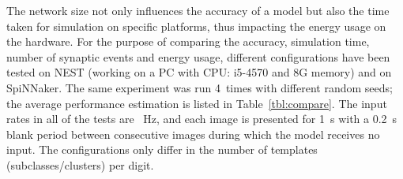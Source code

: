 The network size not only influences the accuracy of a model but also the time taken for simulation on specific platforms, thus impacting the energy usage on the hardware.
For the purpose of comparing the accuracy, simulation time, number of synaptic events and energy usage, different configurations have been tested on NEST (working on a PC with CPU: i5-4570 and 8G \DIFaddbegin {}\DIFaddend memory) and on SpiNNaker.
The same experiment was run 4~times with different random seeds; the average performance estimation is listed in Table~\ref{tbl:compare}.
The input rates in all of the tests are \DIFdelbegin {}\DIFdelend \DIFaddbegin {}\DIFaddend ~Hz, and each image is presented for 1~s with a 0.2~s blank period between consecutive images during which the model receives no input.
The configurations only differ in the number of templates (subclasses/clusters) per digit.
